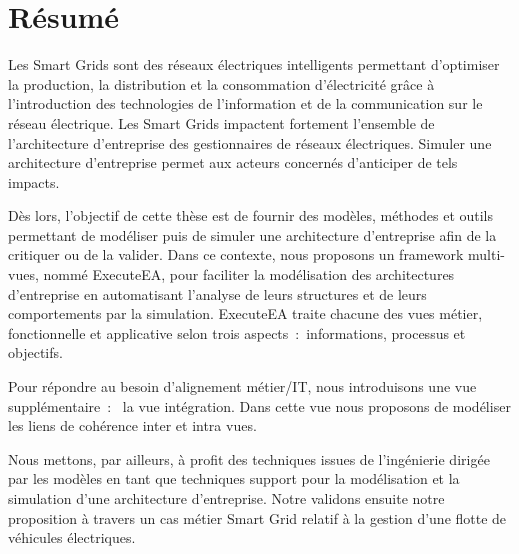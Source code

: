 \chapter*{Résumé}

Les Smart Grids sont des réseaux électriques intelligents permettant d'optimiser la
production, la distribution et la consommation d'électricité grâce à l'introduction des
technologies de l'information et de la communication sur le réseau électrique. Les Smart
Grids impactent fortement l'ensemble de l'architecture d'entreprise des gestionnaires de
réseaux électriques. Simuler une architecture d'entreprise permet aux acteurs concernés
d'anticiper de tels impacts.

Dès lors, l'objectif de cette thèse est de fournir des modèles, méthodes et outils permettant de
modéliser puis de simuler une architecture d'entreprise afin de la critiquer ou de la valider.
Dans ce contexte, nous proposons un framework multi-vues, nommé ExecuteEA, pour
faciliter la modélisation des architectures d'entreprise en automatisant l'analyse de leurs
structures et de leurs comportements par la simulation. ExecuteEA traite chacune des vues
métier, fonctionnelle et applicative selon trois aspects~:~informations, processus et objectifs.

Pour répondre au besoin d'alignement métier/IT, nous introduisons une vue supplémentaire~:~
la vue intégration. Dans cette vue nous proposons de modéliser les liens de cohérence inter et
intra vues.

Nous mettons, par ailleurs, à profit des techniques issues de l'ingénierie dirigée par les modèles
en tant que techniques support pour la modélisation et la simulation d'une architecture
d'entreprise. Notre validons ensuite notre proposition à travers un cas métier Smart Grid
relatif à la gestion d'une flotte de véhicules électriques.